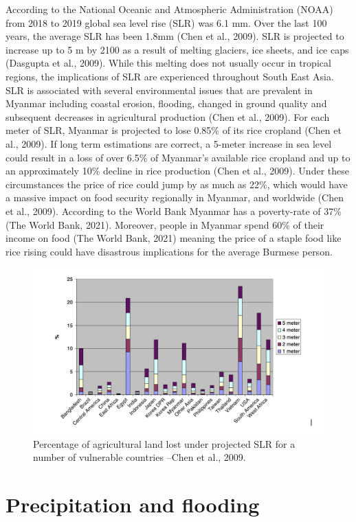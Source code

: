 \documentclass{book}\usepackage{knitr}
\begin{document}
According to the National Oceanic and Atmospheric Administration (NOAA) from 2018 to 2019 global sea level rise (SLR) was 6.1 mm. Over the last 100 years, the average SLR has been 1.8mm (Chen et al., 2009). SLR is projected to increase up to 5 m by 2100 as a result of melting glaciers, ice sheets, and ice caps (Dasgupta et al., 2009). While this melting does not usually occur in tropical regions, the implications of SLR are experienced throughout South East Asia. SLR is associated with several environmental issues that are prevalent in Myanmar including coastal erosion, flooding, changed in ground quality and subsequent decreases in agricultural production (Chen et al., 2009).
	For each meter of SLR, Myanmar is projected to lose 0.85\% of its rice cropland (Chen et al., 2009). If long term estimations are correct, a 5-meter increase in sea level could result in a loss of over 6.5\% of Myanmar’s available rice cropland and up to an approximately 10\% decline in rice production (Chen et al., 2009). Under these circumstances the price of rice could jump by as much as 22\%, which would have a massive impact on food security regionally in Myanmar, and worldwide (Chen et al., 2009). According to the World Bank Myanmar has a poverty-rate of 37\% (The World Bank, 2021). Moreover, people in Myanmar spend 60\% of their income on food (The World Bank, 2021) meaning the price of a staple food like rice rising could have disastrous implications for the average Burmese person.

\begin{figure}
\includegraphics[width=\linewidth]{images/myanmar/Image6.jpg}
\caption{Percentage of agricultural land lost under projected SLR for a number of vulnerable countries --Chen et al., 2009.}
\end{figure}

\section{Precipitation and flooding}
\end{document}
